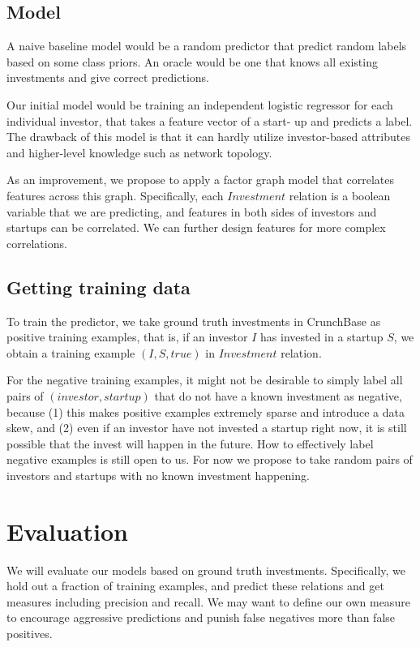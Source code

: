 \subsection{Model}\label{model}

A naive baseline model would be a random predictor that predict random
labels based on some class priors. An oracle would be one that knows all
existing investments and give correct predictions.

Our initial model would be training an independent logistic regressor
for each individual investor, that takes a feature vector of a start- up
and predicts a label. The drawback of this model is that it can hardly
utilize investor-based attributes and higher-level knowledge such as
network topology.

As an improvement, we propose to apply a factor graph model that
correlates features across this graph. Specifically, each \(Investment\)
relation is a boolean variable that we are predicting, and features in
both sides of investors and startups can be correlated. We can further
design features for more complex correlations.

\subsection{Getting training data}\label{getting-training-data}

To train the predictor, we take ground truth investments in CrunchBase
as positive training examples, that is, if an investor \(I\) has
invested in a startup \(S\), we obtain a training example
\((I, S, true)\) in \(Investment\) relation.

For the negative training examples, it might not be desirable to simply
label all pairs of \((investor, startup)\) that do not have a known
investment as negative, because (1) this makes positive examples
extremely sparse and introduce a data skew, and (2) even if an investor
have not invested a startup right now, it is still possible that the
invest will happen in the future. How to effectively label negative
examples is still open to us. For now we propose to take random pairs of
investors and startups with no known investment happening.

\section{Evaluation}\label{evaluation}

We will evaluate our models based on ground truth investments.
Specifically, we hold out a fraction of training examples, and predict
these relations and get measures including precision and recall. We may
want to define our own measure to encourage aggressive predictions and
punish false negatives more than false positives.

